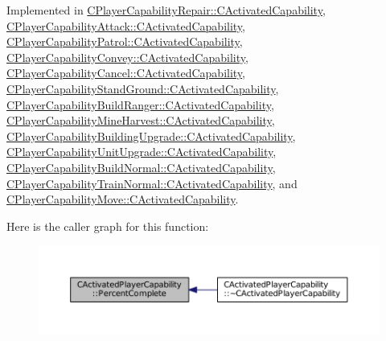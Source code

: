 Implemented in \hyperlink{classCPlayerCapabilityRepair_1_1CActivatedCapability_a88276fec60e08b56daecfd14b36fe888}{C\+Player\+Capability\+Repair\+::\+C\+Activated\+Capability}, \hyperlink{classCPlayerCapabilityAttack_1_1CActivatedCapability_a75866109b62de0522622b03137461519}{C\+Player\+Capability\+Attack\+::\+C\+Activated\+Capability}, \hyperlink{classCPlayerCapabilityPatrol_1_1CActivatedCapability_a868e6583a55b01e5aa3b926ef14677bc}{C\+Player\+Capability\+Patrol\+::\+C\+Activated\+Capability}, \hyperlink{classCPlayerCapabilityConvey_1_1CActivatedCapability_aec6b75fc004f4ac18755d8f601c8ffca}{C\+Player\+Capability\+Convey\+::\+C\+Activated\+Capability}, \hyperlink{classCPlayerCapabilityCancel_1_1CActivatedCapability_a69d2fec27186cba11ab545560e7bf45d}{C\+Player\+Capability\+Cancel\+::\+C\+Activated\+Capability}, \hyperlink{classCPlayerCapabilityStandGround_1_1CActivatedCapability_aa9bf1824e755460b699d81f866f2aadc}{C\+Player\+Capability\+Stand\+Ground\+::\+C\+Activated\+Capability}, \hyperlink{classCPlayerCapabilityBuildRanger_1_1CActivatedCapability_a2e1c0859b129404fe1cc65bcdb187bad}{C\+Player\+Capability\+Build\+Ranger\+::\+C\+Activated\+Capability}, \hyperlink{classCPlayerCapabilityMineHarvest_1_1CActivatedCapability_ac198166a008306dc543ceed94baaf4a3}{C\+Player\+Capability\+Mine\+Harvest\+::\+C\+Activated\+Capability}, \hyperlink{classCPlayerCapabilityBuildingUpgrade_1_1CActivatedCapability_afb2aab171773fa9f33539e33315c1c28}{C\+Player\+Capability\+Building\+Upgrade\+::\+C\+Activated\+Capability}, \hyperlink{classCPlayerCapabilityUnitUpgrade_1_1CActivatedCapability_a16026f30b1ec10fbd4cb7049d0b74719}{C\+Player\+Capability\+Unit\+Upgrade\+::\+C\+Activated\+Capability}, \hyperlink{classCPlayerCapabilityBuildNormal_1_1CActivatedCapability_a40bf27f9dfe88ad17a51ebb12c078568}{C\+Player\+Capability\+Build\+Normal\+::\+C\+Activated\+Capability}, \hyperlink{classCPlayerCapabilityTrainNormal_1_1CActivatedCapability_ac0d2dd8e1b3aedb0873149ba4c92e6f7}{C\+Player\+Capability\+Train\+Normal\+::\+C\+Activated\+Capability}, and \hyperlink{classCPlayerCapabilityMove_1_1CActivatedCapability_a1696dd16d89d0978284a95dd1531d0d5}{C\+Player\+Capability\+Move\+::\+C\+Activated\+Capability}.

Here is the caller graph for this function\+:
\nopagebreak
\begin{figure}[H]
\begin{center}
\leavevmode
\includegraphics[width=350pt]{classCActivatedPlayerCapability_a405dc6076058006a4f801727de4cfe4d_icgraph}
\end{center}
\end{figure}


